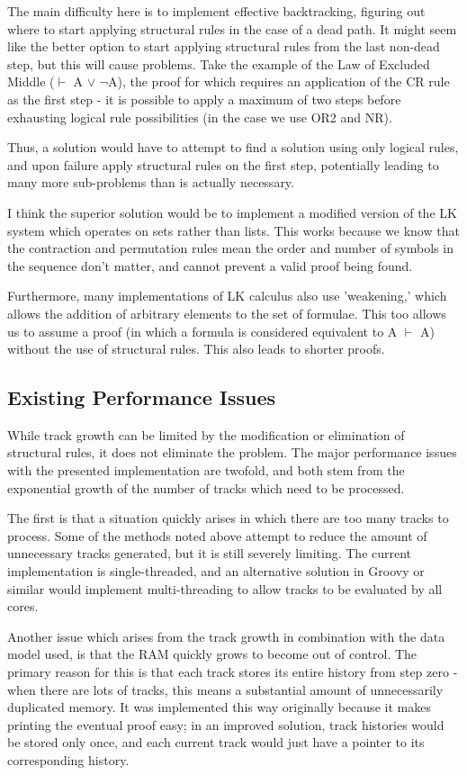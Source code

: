 \documentclass{article}
\begin{document}
The main difficulty here is to implement
effective backtracking, figuring out where to start applying structural rules
in the case of a dead path. It might seem like the better option to start
applying structural rules from the last non-dead step, but this will cause
problems. Take the example of the Law of Excluded Middle
($\vdash$ A $\vee$ $\neg$A), the proof for which requires an application of the
CR rule as the first step - it is possible to apply a maximum of two steps
before exhausting logical rule possibilities (in the case we use OR2 and NR).

Thus, a solution would have to attempt to find a solution using only logical
rules, and upon failure apply structural rules on the first step, potentially
leading to many more sub-problems than is actually necessary.

I think the superior solution would be to implement a modified version of the LK
system which operates on sets rather than lists. This works because we know
that the contraction and permutation rules mean the order and number of symbols
in the sequence don't matter, and cannot prevent a valid proof being found.

Furthermore, many implementations of LK calculus also use 'weakening,' which
allows the addition of arbitrary elements to the set of formulae. This too
allows us to assume a proof (in which a formula is considered equivalent to A
$\vdash$ A) without the use of structural rules. This also leads to shorter
proofs.

\subsection{Existing Performance Issues}

While track growth can be limited by the modification or elimination of
structural rules, it does not eliminate the problem. The major performance 
issues with the presented implementation are twofold, and both stem from the 
exponential growth of the number of tracks which need to be processed.

The first is that a situation quickly arises in which there are too many tracks
to process. Some of the methods noted above attempt to reduce the amount of
unnecessary tracks generated, but it is still severely limiting. The current
implementation is single-threaded, and an alternative solution in Groovy or
similar would implement multi-threading to allow tracks to be evaluated by all
cores.

Another issue which arises from the track growth in combination with the data
model used, is that the RAM quickly grows to become out of control. The primary
reason for this is that each track stores its entire history from step zero -
when there are lots of tracks, this means a substantial amount of unnecessarily
duplicated memory. It was implemented this way originally because it makes 
printing the eventual proof easy; in an improved solution, track histories would
be stored only once, and each current track would just have a pointer to its
corresponding history.
\end{document}
